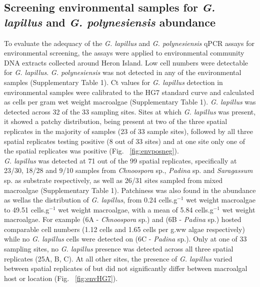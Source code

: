 \documentclass[12pt]{article}
\begin{document}
\subsection*{Screening environmental samples for \emph{G. lapillus} and \emph{G. polynesiensis} abundance}
To evaluate the adequacy of the \emph{G. lapillus} and \emph{G. polynesiensis} qPCR assays for environmental screening, the assays were applied to environmental community DNA extracts collected around Heron Island. Low cell numbers were detectable for \emph{G. lapillus}. \emph{G. polynesiensis} was not detected in any of the environmental samples (Supplementary Table 1).
Ct values for \emph{G. lapillus} detection in environmental samples were calibrated to the HG7 standard curve and calculated as cells per gram wet weight macroalgae (Supplementary Table 1). 
\emph{G. lapillus} was detected across 32 of the 33 sampling sites. Sites at which \textit{G. lapillus} was present, it showed a patchy distribution, being present at two of the three spatial replicates in the majority of samples (23 of 33 sample sites), followed by all three spatial replicates testing positive (8 out of 33 sites) and at one site only one of the spatial replicates was positive (Fig. ~\ref{fig:envposneg}). \\
\emph{G. lapillus} was detected at 71 out of the 99 spatial replicates, specifically at 23/30, 18/28 and 9/10 samples from \emph{Chnoospora} sp., \emph{Padina} sp. and \emph{Saragassum} sp. as substrate respectively, as well as 26/31 sites sampled from mixed macroalgae (Supplementary Table 1).
Patchiness was also found in the abundance as wellas the distribution of 
\emph{G. lapillus}, from 0.24 cells.g$^{-1}$ wet weight macroalgae to 49.51 cells.g$^{-1}$ wet weight macroalgae, with a mean of 5.84 cells.g$^{-1}$ wet weight macroalgae. For example (6A - \emph{Chnoospora} sp.) and (6B - \emph{Padina} sp.) hosted comparable cell numbers (1.12 cells and 1.65 cells per g.ww algae respectively) while no \emph{G. lapillus} cells were detected on (6C - \emph{Padina} sp.).
Only at one of 33 sampling sites, no \emph{G. lapillus} presence was detected across all three spatial replicates (25A, B, C).
At all other sites, the presence of \textit{G. lapillus} varied between spatial replicates of but did not significantly differ between macroalgal host or location (Fig. ~\ref{fig:envHG7}). 

\newpage
\end{document}
